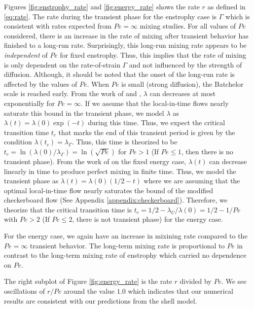 \documentclass{jfm}
\begin{document}
 
 Figures \ref{fig:enstrophy_rate} and \ref{fig:energy_rate} shows the rate $r$ as defined in \eqref{eq:rate}. The rate during the transient phase for the enstrophy case is $\Gamma$ which is consistent with rates expected from $Pe=\infty$ mixing studies.  For all values of $Pe$ considered, there is an increase in the rate of mixing after transient behavior has finished to a long-run rate. Surprisingly, this long-run mixing rate appears to be {\it independent} of $Pe$ for fixed enstrophy. Thus, this implies that the rate of mixing is only dependent on the rate-of-strain $\Gamma$ and not influenced by the strength of diffusion. Although, it should be noted that the onset of the long-run rate is affected by the values of $Pe$. When $Pe$ is small (strong diffusion), the Batchelor scale is reached early. From the work of \cite{GI2014} and \cite{CS2013}, $\lambda$ can decreases at most exponentially for $Pe = \infty$. If we assume that the local-in-time flows nearly saturate this bound in the transient phase, we model $\lambda$ as  $\lambda (t) = \lambda(0)\exp(- t) $ during this time. Thus, we expect the critical transition time $t_{c}$ that marks the end of this transient period is given by the condition $\lambda(t_{c})= \lambda_{\Gamma}$. Thus, this time is theorized to be $t_{c}=\ln(\lambda(0)/\lambda_{\Gamma}) = \ln ( \sqrt{Pe} )$ for $Pe>1$ (If $Pe \leq 1$, then there is no transient phase).  From the work of \cite{JMP2012} on the fixed energy case, $\lambda(t)$ can decrease linearly in time to produce perfect mixing in finite time. Thus, we model the transient phase as $\lambda(t)=\lambda(0)(1/2-t)$ where we are assuming that the optimal local-in-time flow nearly saturates the bound of the modified checkerboard flow (See Appendix \ref{appendix:checkerboard}). Therefore, we theorize that the critical transition time is $t_{c}=1/2 - \lambda_{U}/\lambda(0) = 1/2 - 1/Pe$ with $Pe> 2$ (If $Pe \leq 2$, there is not transient phase) for the energy case.
 
 
 
 For the energy case, we again have an increase in mixining rate compared to the $Pe=\infty$ transient behavior. The long-term mixing rate is proportional to $Pe$ in contrast to the long-term mixing rate of enstrophy which carried no dependence on $Pe$. 

The right subplot of Figure \ref{fig:energy_rate} is the rate $r$ divided by $Pe$. We see oscillations of $r/Pe$ around the value $1.0$ which indicates that our numerical results are consistent with our predictions from the shell model.
\end{document}
